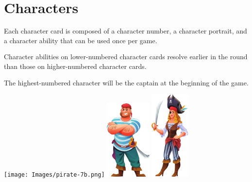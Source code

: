 \section*{Characters}
Each character card is composed of a character number, a character portrait, and a character ability that can be used once per game.

Character abilities on lower-numbered character cards resolve earlier in the round than those on higher-numbered character cards.

The highest-numbered character will be the captain at the beginning of the game.

\vfill

\begin{center}
\texttt{[image: Images/pirate-7b.png]}
\qquad
\includegraphics[height=4cm]{Images/pirate-1.png}
\qquad
\includegraphics[height=4.5cm]{Images/pirate-2.png}
\end{center}